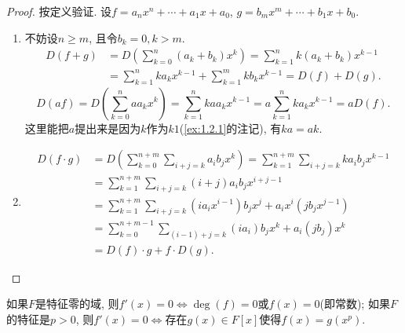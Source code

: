 \begin{proof}
    按定义验证. 设$f = a_nx^n + \cdots + a_1x + a_0$, $g = b_mx^m + \cdots + b_1x + b_0$.
    \begin{enumerate}[(1)]
        \item 不妨设$n \geqslant m$, 且令$b_k = 0, k > m$.
        \[
        \begin{aligned}
            D(f + g) &= D\left(\sum_{k = 0}^{n} (a_k + b_k)x^k\right) = \sum_{k = 1}^{n} k(a_k + b_k)x^{k - 1}\\ 
            &= \sum_{k = 1}^{n} ka_kx^{k - 1} + \sum_{k = 1}^{m} kb_kx^{k - 1} = D(f) + D(g).
        \end{aligned}
        \]
        \[
            D(af) = D\left(\sum_{k = 0}^{n} aa_kx^k\right) = \sum_{k = 1}^{n} kaa_kx^{k - 1} = a\sum_{k = 1}^{n} ka_kx^{k - 1} = aD(f).
        \]
        这里能把$a$提出来是因为$k$作为$k1$(\ref{ex:1.2.1}的注记), 有$ka = ak$.
        \item 
        \[
        \begin{aligned}
            D(f \cdot g) &= D\left(\sum_{k = 0}^{n + m} \sum_{i + j = k} a_ib_jx^k\right) = \sum_{k = 1}^{n + m} \sum_{i + j = k} ka_ib_jx^{k - 1}\\
            &= \sum_{k = 1}^{n + m} \sum_{i + j = k} (i + j)a_ib_jx^{i + j - 1}\\
            &= \sum_{k = 1}^{n + m} \sum_{i + j = k} (ia_ix^{i - 1})b_jx^j + a_ix^i(jb_jx^{j - 1})\\
            &= \sum_{k = 0}^{n + m - 1} \sum_{(i - 1) + j = k} (ia_i)b_jx^{k} + a_i(jb_j)x^k\\
            &= D(f) \cdot g + f \cdot D(g).
        \end{aligned}
        \]
    \end{enumerate}
\end{proof}

\begin{problem}
    如果$F$是特征零的域, 则$f'(x) = 0 \Leftrightarrow \deg(f) = 0$或$f(x) = 0$(即常数); 如果$F$的特征是$p > 0$, 则$f'(x) = 0 \Leftrightarrow$存在$g(x) \in F[x]$使得$f(x) = g(x^p)$.
\end{problem}

